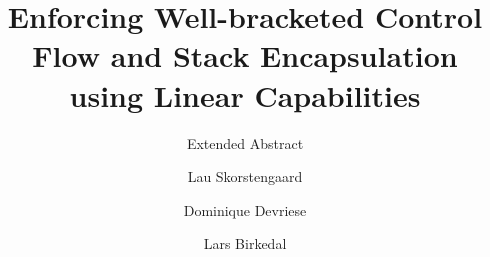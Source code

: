 \documentclass[sigplan, review]{acmart}
\begin{document}
\title{Enforcing Well-bracketed Control Flow and Stack Encapsulation using Linear Capabilities}
\subtitle{Extended Abstract}

\author{Lau Skorstengaard}

\author{Dominique Devriese}

\author{Lars Birkedal}




%
%

\end{document}
